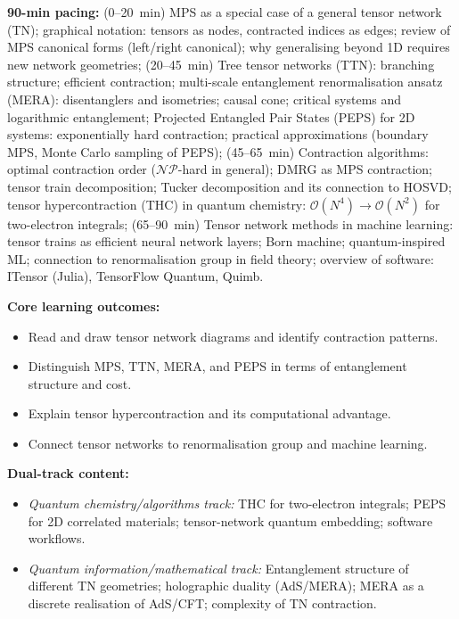 \documentclass[11pt,a4paper]{article}
\begin{document}
\begin{tcolorbox}[modulebox, title={Module~II.1 / L08: Tensor Networks}]
\textbf{90-min pacing:} (0--20~min) MPS as a special case of a general tensor network (TN);
graphical notation: tensors as nodes, contracted indices as edges;
review of MPS canonical forms (left/right canonical);
why generalising beyond 1D requires new network geometries;
(20--45~min) Tree tensor networks (TTN): branching structure; efficient contraction;
multi-scale entanglement renormalisation ansatz (MERA): disentanglers and isometries;
causal cone; critical systems and logarithmic entanglement;
Projected Entangled Pair States (PEPS) for 2D systems: exponentially hard contraction;
practical approximations (boundary MPS, Monte Carlo sampling of PEPS);
(45--65~min) Contraction algorithms: optimal contraction order ($\mathcal{NP}$-hard in
general); DMRG as MPS contraction; tensor train decomposition;
Tucker decomposition and its connection to HOSVD;
tensor hypercontraction (THC) in quantum chemistry: $\mathcal{O}(N^4)\to\mathcal{O}(N^2)$
for two-electron integrals;
(65--90~min) Tensor network methods in machine learning: tensor trains as efficient
neural network layers; Born machine; quantum-inspired ML;
connection to renormalisation group in field theory;
overview of software: ITensor (Julia), TensorFlow Quantum, Quimb.

\medskip\textbf{Core learning outcomes:}
\begin{itemize}[leftmargin=1.4em,topsep=2pt,itemsep=1pt]
  \item Read and draw tensor network diagrams and identify contraction patterns.
  \item Distinguish MPS, TTN, MERA, and PEPS in terms of entanglement structure and cost.
  \item Explain tensor hypercontraction and its computational advantage.
  \item Connect tensor networks to renormalisation group and machine learning.
\end{itemize}

\medskip\textbf{Dual-track content:}
\begin{itemize}[leftmargin=1.4em,topsep=2pt,itemsep=1pt]
  \item \textit{Quantum chemistry/algorithms track:} THC for two-electron integrals;
    PEPS for 2D correlated materials; tensor-network quantum embedding; software workflows.
  \item \textit{Quantum information/mathematical track:} Entanglement structure of different TN
    geometries; holographic duality (AdS/MERA); MERA as a discrete realisation of AdS/CFT;
    complexity of TN contraction.
\end{itemize}


\end{tcolorbox}
\end{document}
